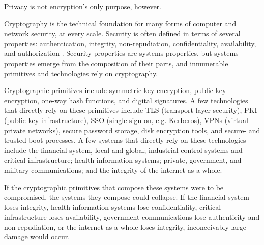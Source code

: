 Privacy is not encryption's only purpose, however.


Cryptography is the technical foundation for many forms of computer and network security, at every scale. Security is
often defined in terms of several properties: authentication, integrity, non-repudiation, confidentiality, availability,
and authorization \cite{shostack_threat_2014}. Security properties are systems properties, but systems properties emerge
from the composition of their parts, and innumerable primitives and technologies rely on cryptography.

Cryptographic primitives include symmetric key encryption, public key encryption, one-way hash functions, and digital
signatures. A few technologies that directly rely on these primitives include TLS (transport layer security), PKI
(public key infrastructure), SSO (single sign on, e.g. Kerberos), VPNs (virtual private networks), secure password
storage, disk encryption tools, and secure- and trusted-boot processes. A few systems that directly rely on these
technologies include the financial system, local and global; industrial control systems and critical infrastructure;
health information systems; private, government, and military communications; and the integrity of the internet as a
whole.

If the cryptographic primitives that compose these systems were to be compromised, the systems they compose could
collapse. If the financial system loses integrity, health information systems lose confidentiality, critical
infrastructure loses availability, government communications lose authenticity and non-repudiation, or the internet as a
whole loses integrity, inconceivably large damage would occur.



